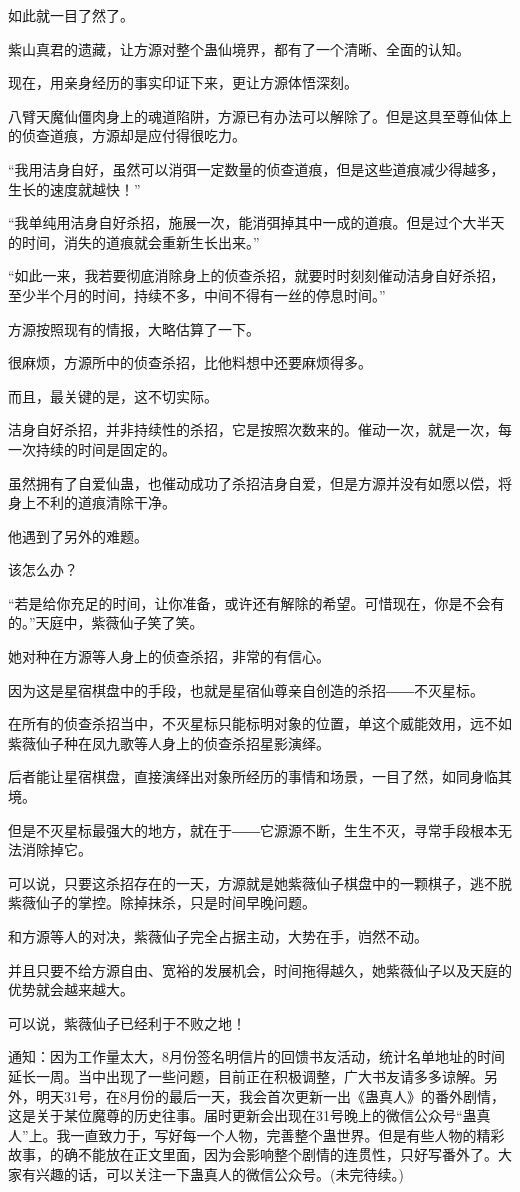 \begin{this_body}
如此就一目了然了。

紫山真君的遗藏，让方源对整个蛊仙境界，都有了一个清晰、全面的认知。

现在，用亲身经历的事实印证下来，更让方源体悟深刻。

八臂天魔仙僵肉身上的魂道陷阱，方源已有办法可以解除了。但是这具至尊仙体上的侦查道痕，方源却是应付得很吃力。

“我用洁身自好，虽然可以消弭一定数量的侦查道痕，但是这些道痕减少得越多，生长的速度就越快！”

“我单纯用洁身自好杀招，施展一次，能消弭掉其中一成的道痕。但是过个大半天的时间，消失的道痕就会重新生长出来。”

“如此一来，我若要彻底消除身上的侦查杀招，就要时时刻刻催动洁身自好杀招，至少半个月的时间，持续不多，中间不得有一丝的停息时间。”

方源按照现有的情报，大略估算了一下。

很麻烦，方源所中的侦查杀招，比他料想中还要麻烦得多。

而且，最关键的是，这不切实际。

洁身自好杀招，并非持续性的杀招，它是按照次数来的。催动一次，就是一次，每一次持续的时间是固定的。

虽然拥有了自爱仙蛊，也催动成功了杀招洁身自爱，但是方源并没有如愿以偿，将身上不利的道痕清除干净。

他遇到了另外的难题。

该怎么办？

“若是给你充足的时间，让你准备，或许还有解除的希望。可惜现在，你是不会有的。”天庭中，紫薇仙子笑了笑。

她对种在方源等人身上的侦查杀招，非常的有信心。

因为这是星宿棋盘中的手段，也就是星宿仙尊亲自创造的杀招――不灭星标。

在所有的侦查杀招当中，不灭星标只能标明对象的位置，单这个威能效用，远不如紫薇仙子种在凤九歌等人身上的侦查杀招星影演绎。

后者能让星宿棋盘，直接演绎出对象所经历的事情和场景，一目了然，如同身临其境。

但是不灭星标最强大的地方，就在于――它源源不断，生生不灭，寻常手段根本无法消除掉它。

可以说，只要这杀招存在的一天，方源就是她紫薇仙子棋盘中的一颗棋子，逃不脱紫薇仙子的掌控。除掉抹杀，只是时间早晚问题。

和方源等人的对决，紫薇仙子完全占据主动，大势在手，岿然不动。

并且只要不给方源自由、宽裕的发展机会，时间拖得越久，她紫薇仙子以及天庭的优势就会越来越大。

可以说，紫薇仙子已经利于不败之地！

通知：因为工作量太大，8月份签名明信片的回馈书友活动，统计名单地址的时间延长一周。当中出现了一些问题，目前正在积极调整，广大书友请多多谅解。另外，明天31号，在8月份的最后一天，我会首次更新一出《蛊真人》的番外剧情，这是关于某位魔尊的历史往事。届时更新会出现在31号晚上的微信公众号“蛊真人”上。我一直致力于，写好每一个人物，完善整个蛊世界。但是有些人物的精彩故事，的确不能放在正文里面，因为会影响整个剧情的连贯性，只好写番外了。大家有兴趣的话，可以关注一下蛊真人的微信公众号。(未完待续。)

\end{this_body}

